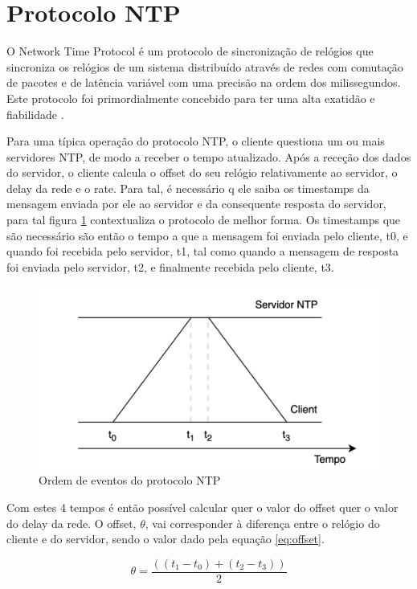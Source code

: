 \section{Protocolo NTP}
\label{sec:NTP}

O Network Time Protocol é um protocolo de sincronização
de relógios que sincroniza os relógios de um sistema distribuído 
através de redes com comutação de pacotes e de latência variável 
com uma precisão na ordem dos milissegundos. Este protocolo
foi primordialmente concebido para ter uma alta exatidão 
e fiabilidade \cite{b2}.

Para uma típica operação do protocolo NTP,
o cliente questiona um ou mais servidores NTP, de modo a 
receber o tempo atualizado. Após a receção dos dados do servidor, 
o cliente calcula o offset do seu relógio relativamente ao servidor, o delay da rede e o rate. Para tal, é necessário q ele saiba os timestamps da mensagem enviada por ele ao servidor e da consequente resposta do servidor,
para tal figura \ref{fig:diagramaNTP} contextualiza o protocolo de melhor
forma. Os timestamps que são necessário são então o tempo a que
a mensagem foi enviada pelo cliente, t0, e quando foi recebida pelo
servidor, t1, tal como quando a mensagem de resposta foi enviada
pelo servidor, t2, e finalmente recebida pelo cliente, t3.

    \begin{figure}[h]
        \centering
        \includegraphics[width=0.8\linewidth]{figures/diagramaNTP.png}
        \caption{Ordem de eventos do protocolo NTP}
        \label{fig:diagramaNTP}
    \end{figure}

Com estes 4 tempos é então possível calcular quer o valor do offset quer o valor 
do delay da rede. O offset, $\theta$, vai corresponder 
à diferença entre o relógio do cliente e do servidor, sendo o valor dado pela equação \ref{eq:offset}. 


\begin{equation} \label{eq:offset}
\theta = \frac{\left( (t_{\text{1}} - t_{\text{0}}) + (t_{\text{2}} - t_{\text{3}}) \right)}{2} 
\end{equation}

